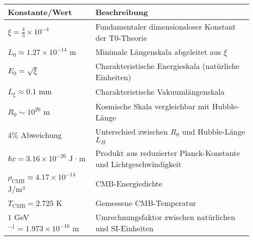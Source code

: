 \documentclass[12pt,a4paper]{article}
\numberwithin{equation}{section}
\begin{document}
	\begin{longtable}{p{4cm} p{10cm}}
		\toprule
		\textbf{Konstante/Wert} & \textbf{Beschreibung} \\
		\midrule
		\endhead
		
		$\xi = \frac{4}{3} \times 10^{-4}$ & Fundamentaler dimensionsloser Konstant der T0-Theorie \\
		$L_0 \approx 1.27 \times 10^{-14}$ m & Minimale Längenskala abgeleitet aus $\xi$ \\
		$E_0 = \sqrt{\xi}$ & Charakteristische Energieskala (natürliche Einheiten) \\
		$L_\xi \approx 0.1$ mm & Charakteristische Vakuumlängenskala \\
		$R_0 \sim 10^{26}$ m & Kosmische Skala vergleichbar mit Hubble-Länge \\
		$4\%$ Abweichung & Unterschied zwischen $R_0$ und Hubble-Länge $L_H$ \\
		$\hbar c = 3.16 \times 10^{-26}$ J·m & Produkt aus reduzierter Planck-Konstante und Lichtgeschwindigkeit \\
		$\rho_{\text{CMB}} \approx 4.17 \times 10^{-14}$ J/m³ & CMB-Energiedichte \\
		$T_{\text{CMB}} = 2.725$ K & Gemessene CMB-Temperatur \\
		$1$ GeV$^{-1} = 1.973 \times 10^{-16}$ m & Umrechnungsfaktor zwischen natürlichen und SI-Einheiten \\
		\bottomrule
	\end{longtable}
	
\end{document}

